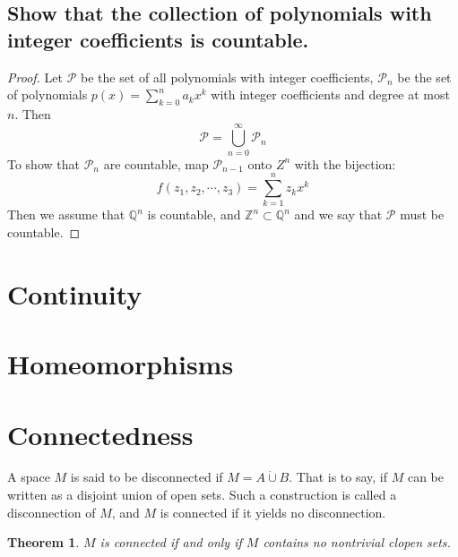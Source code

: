 \documentclass{article}
\newtheorem{theorem}{Theorem}[section]
\theoremstyle{definition}
\begin{document}
    \subsection{Show that the collection of polynomials with integer coefficients is countable.}
        \begin{proof}
            Let $\mathcal{P}$ be the set of all polynomials with integer coefficients, $\mathcal{P}_n$ be the set of polynomials $p(x) = \sum_{k=0}^na_kx^k$ with integer coefficients and degree at most $n$. Then
            \[
                \mathcal{P} = \bigcup_{n=0}^\infty \mathcal{P}_n
            \]
            To show that $\mathcal{P}_n$ are countable, map $\mathcal{P}_{n-1}$ onto $Z^n$ with the bijection:
            \[
                f(z_1, z_2, \cdots, z_3) = \sum_{k=1}^n z_k x^k
            \]
            Then we assume that $\mathbb{Q}^n$ is countable, and $\mathbb{Z}^n \subset \mathbb{Q}^n$ and we say that $\mathcal{P}$ must be countable.
        \end{proof}
\section{Continuity}
\section{Homeomorphisms}
\section{Connectedness}
    A space $M$ is said to be disconnected if $M = A \dot \cup B$. That is to say, if $M$ can be written as a disjoint union of open sets.
    Such a construction is called a disconnection of $M$, and $M$ is connected if it yields no disconnection.
    \begin{theorem}
        $M$ is connected if and only if $M$ contains no nontrivial clopen sets.
    \end{theorem}
\end{document}
